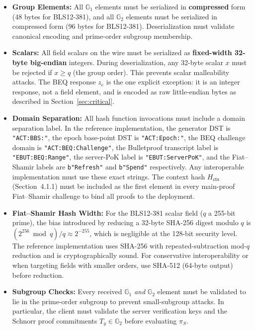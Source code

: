 \documentclass[11pt]{article}
\theoremstyle{definitionstyle}
\theoremstyle{plain}
\begin{document}
\begin{itemize}[leftmargin=*]
\item \textbf{Group Elements:} All $\mathbb{G}_1$ elements must be serialized in \textbf{compressed} form (48 bytes for BLS12-381), and all $\mathbb{G}_2$ elements must be serialized in compressed form (96 bytes for BLS12-381). Deserialization must validate canonical encoding and prime-order subgroup membership.
\item \textbf{Scalars:} All field scalars on the wire must be serialized as \textbf{fixed-width 32-byte big-endian} integers. During deserialization, any 32-byte scalar $x$ must be rejected if $x \ge q$ (the group order). This prevents scalar malleability attacks. The BEQ response $z_e$ is the one explicit exception: it is an integer response, not a field element, and is encoded as raw little-endian bytes as described in Section~\ref{sec:critical}.
\item \textbf{Domain Separation:} All hash function invocations must include a domain separation label. In the reference implementation, the generator DST is \texttt{"ACT:BBS:"}, the epoch base-point DST is \texttt{"ACT:Epoch:"}, the BEQ challenge domain is \texttt{"ACT:BEQ:Challenge"}, the Bulletproof transcript label is \texttt{"EBUT:BEQ:Range"}, the server-PoK label is \texttt{"EBUT:ServerPoK"}, and the Fiat--Shamir labels are \texttt{b"Refresh"} and \texttt{b"Spend"} respectively. Any interoperable implementation must use these exact strings. The context hash $H_{\mathsf{ctx}}$ (Section~4.1.1) must be included as the first element in every main-proof Fiat--Shamir challenge to bind all proofs to the deployment.
\item \textbf{Fiat--Shamir Hash Width:} For the BLS12-381 scalar field ($q$ a 255-bit prime), the bias introduced by reducing a 32-byte SHA-256 digest modulo $q$ is $(2^{256} \bmod q)/q \approx 2^{-255}$, which is negligible at the 128-bit security level. The reference implementation uses SHA-256 with repeated-subtraction mod-$q$ reduction and is cryptographically sound. For conservative interoperability or when targeting fields with smaller orders, use SHA-512 (64-byte output) before reduction.
\item \textbf{Subgroup Checks:} Every received $\mathbb{G}_1$ \emph{and} $\mathbb{G}_2$ element must be validated to lie in the prime-order subgroup to prevent small-subgroup attacks. In particular, the client must validate the server verification keys and the Schnorr proof commitments $T_y \in \mathbb{G}_2$ before evaluating $\pi_S$.
\end{itemize}
\end{document}

